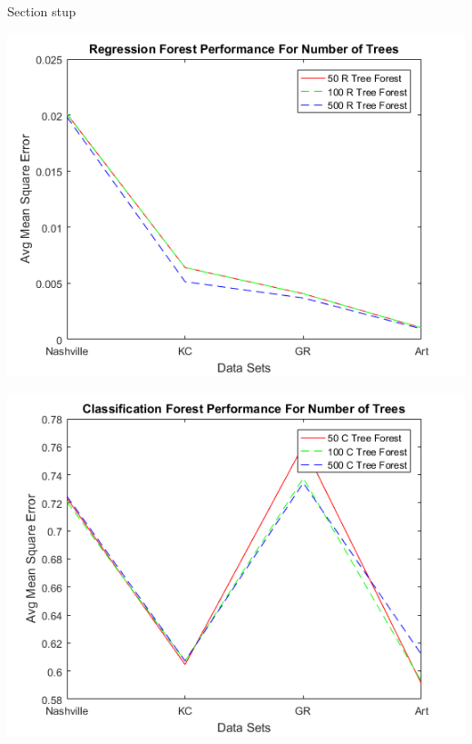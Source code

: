 \documentclass[10pt]{article}
\begin{document}
\begin{multicols}{2}
		Section stup

		\begin{center}
		\captionsetup{type=figure}
			\includegraphics[scale=0.6]{Images/RegressionGraphPerformanceForNumberOfTrees} \\
			\label{fig:r_forest_treenum_perf}
		\end{center}

		\begin{center}
		\captionsetup{type=figure}
			\includegraphics[scale=0.6]{Images/ClassificationGraphPerformanceForNumberOfTrees} \\
			\label{fig:c_forest_treenum_perf}
		\end{center}
		

\end{multicols}
\end{document}
